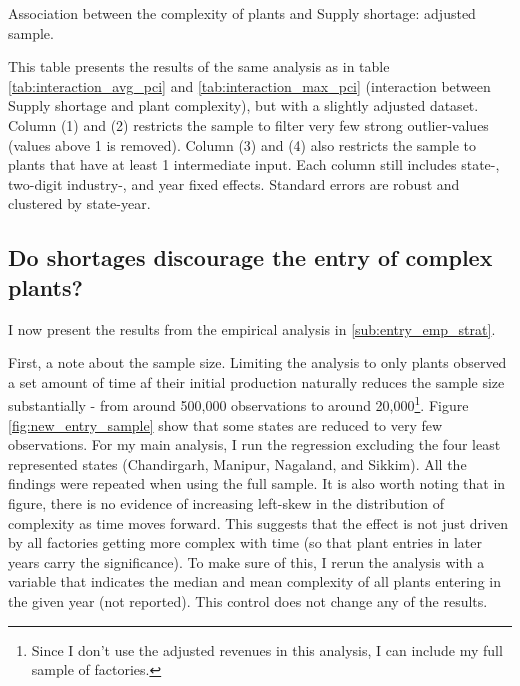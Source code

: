 \documentclass[11pt]{article}
\begin{document}
\begin{table} 
	\begin{center}
		\begin{threeparttable}
			\caption{Association between the complexity of plants and Supply shortage: adjusted sample.}
			\label{tab:filtered_input}
			
			\begin{tablenotes} \footnotesize 
			\item[1] This table presents the results of the same analysis as in table \ref{tab:interaction_avg_pci} and \ref{tab:interaction_max_pci} (interaction between Supply shortage and plant complexity), but with a slightly adjusted dataset. Column (1) and (2) restricts the sample to filter very few strong outlier-values (values above 1 is removed). Column (3) and (4) also restricts the sample to plants that have at least 1 intermediate input. Each column still includes state-, two-digit industry-, and year fixed effects. Standard errors are robust and clustered by state-year.
			\end{tablenotes}
		\end{threeparttable}
	\end{center}
\end{table}   

\subsection{Do shortages discourage the entry of complex plants?}
\label{sub:longterm}
I now present the results from the empirical analysis in \ref{sub:entry_emp_strat}.

First, a note about the sample size. Limiting the analysis to only plants observed a set amount of time af their initial production naturally reduces the sample size substantially - from around 500,000 observations to around 20,000\footnote{Since I don't use the adjusted revenues in this analysis, I can include my full sample of factories.}. Figure \ref{fig:new_entry_sample} show that some states are reduced to very few observations. For my main analysis, I run the regression excluding the four least represented states (Chandirgarh, Manipur, Nagaland, and Sikkim). All the  findings were repeated when using the full sample. It is also worth noting that in figure, there is no evidence of increasing left-skew in the distribution of complexity as time moves forward. This suggests that the effect is not just driven by all factories getting more complex with time (so that plant entries in later years carry the significance). To make sure of this, I rerun the analysis with a variable that indicates the median and mean complexity of all plants entering in the given year (not reported). This control does not change any of the results.
\end{document}
